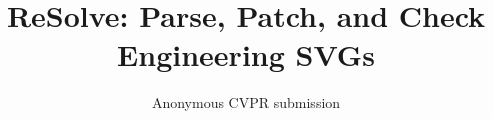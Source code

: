 \documentclass[10pt,twocolumn,letterpaper]{article}
\title{ReSolve: Parse, Patch, and Check\\Engineering SVGs}
\author{Anonymous CVPR submission}
\begin{document}
\maketitle











{
    \small
    
    
}


\end{document}
